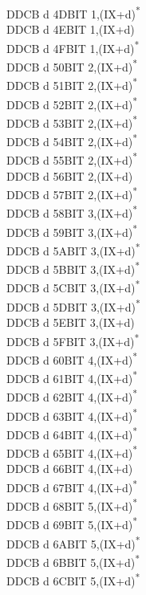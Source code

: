 \documentclass[twoside,openright,a4paper]{book}
\begin{document}
\begin{multicols}{3}
{\begin{tabbing}
	DDCB d 4D\>BIT 1,(IX+d)\textsuperscript{*}\\
	DDCB d 4E\>BIT 1,(IX+d)\\
	DDCB d 4F\>BIT 1,(IX+d)\textsuperscript{*}\\
	DDCB d 50\>BIT 2,(IX+d)\textsuperscript{*}\\
	DDCB d 51\>BIT 2,(IX+d)\textsuperscript{*}\\
	DDCB d 52\>BIT 2,(IX+d)\textsuperscript{*}\\
	DDCB d 53\>BIT 2,(IX+d)\textsuperscript{*}\\
	DDCB d 54\>BIT 2,(IX+d)\textsuperscript{*}\\
	DDCB d 55\>BIT 2,(IX+d)\textsuperscript{*}\\
	DDCB d 56\>BIT 2,(IX+d)\\
	DDCB d 57\>BIT 2,(IX+d)\textsuperscript{*}\\
	DDCB d 58\>BIT 3,(IX+d)\textsuperscript{*}\\
	DDCB d 59\>BIT 3,(IX+d)\textsuperscript{*}\\
	DDCB d 5A\>BIT 3,(IX+d)\textsuperscript{*}\\
	DDCB d 5B\>BIT 3,(IX+d)\textsuperscript{*}\\
	DDCB d 5C\>BIT 3,(IX+d)\textsuperscript{*}\\
	DDCB d 5D\>BIT 3,(IX+d)\textsuperscript{*}\\
	DDCB d 5E\>BIT 3,(IX+d)\\
	DDCB d 5F\>BIT 3,(IX+d)\textsuperscript{*}\\
	DDCB d 60\>BIT 4,(IX+d)\textsuperscript{*}\\
	DDCB d 61\>BIT 4,(IX+d)\textsuperscript{*}\\
	DDCB d 62\>BIT 4,(IX+d)\textsuperscript{*}\\
	DDCB d 63\>BIT 4,(IX+d)\textsuperscript{*}\\
	DDCB d 64\>BIT 4,(IX+d)\textsuperscript{*}\\
	DDCB d 65\>BIT 4,(IX+d)\textsuperscript{*}\\
	DDCB d 66\>BIT 4,(IX+d)\\
	DDCB d 67\>BIT 4,(IX+d)\textsuperscript{*}\\
	DDCB d 68\>BIT 5,(IX+d)\textsuperscript{*}\\
	DDCB d 69\>BIT 5,(IX+d)\textsuperscript{*}\\
	DDCB d 6A\>BIT 5,(IX+d)\textsuperscript{*}\\
	DDCB d 6B\>BIT 5,(IX+d)\textsuperscript{*}\\
	DDCB d 6C\>BIT 5,(IX+d)\textsuperscript{*}\\

\end{tabbing}}
\end{multicols}
\end{document}
